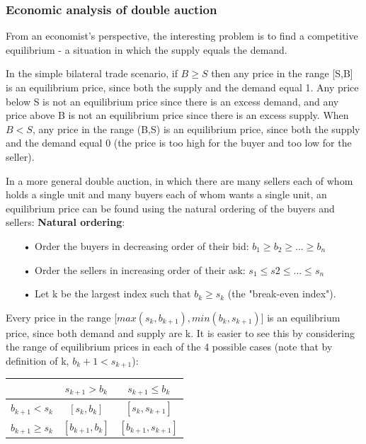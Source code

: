 \documentclass[10pt,a4paper,oneside]{report}
\begin{document}
\subsubsection{Economic analysis of double auction}
From an economist's perspective, the interesting problem is to find a competitive equilibrium - a situation in which the supply equals the demand.

In the simple bilateral trade scenario, if $B \geq S$ then any price in the range [S,B] is an equilibrium price, since both the supply and the demand equal 1. Any price below S is not an equilibrium price since there is an excess demand, and any price above B is not an equilibrium price since there is an excess supply. When $B<S$, any price in the range (B,S) is an equilibrium price, since both the supply and the demand equal 0 (the price is too high for the buyer and too low for the seller).

In a more general double auction, in which there are many sellers each of whom holds a single unit and many buyers each of whom wants a single unit, an equilibrium price can be found using the natural ordering of the buyers and sellers:
\textbf{Natural ordering}:
\begin{enumerate}
\item[\textbf{•}] Order the buyers in decreasing order of their bid: $b_1\geq b_2\geq...\geq b_n$
\item[\textbf{•}] Order the sellers in increasing order of their ask: $s_1\leq s2\leq...\leq s_n$
\item[\textbf{•}] Let k be the largest index such that $b_k\geq s_k$ (the "break-even index").
\end{enumerate}

\citep{gjerstad1998price} Every price in the range [$max(s_k,b_{k+1}),min(b_k,s_{k+1})$] is an equilibrium price, since both demand and supply are k. It is easier to see this by considering the range of equilibrium prices in each of the 4 possible cases (note that by definition of k, $b_k+1 < s_{k+1}$):\\
\begin{table}[h]
\centering
\begin{tabular}{|c|c|c|}\hline
& $s_{k+1} > b_k $	& $s_{k+1}\leq b_k $\\ \hline
$b_{k+1} < s_k	$& $[s_k,b_k]$	&$[s_k,s_{k+1}]$\\ \hline
$b_{k+1} \geq s_k$& $[b_{k+1},b_k]$&$[b_{k+1},s_{k+1}]$\\ \hline

\end{tabular}
\end{table}
\end{document}
